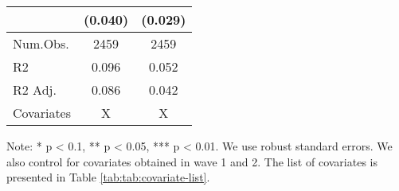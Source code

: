 \begin{table}
\begin{threeparttable}
\begin{tabular}[t]{lcc}
 & (\num{0.040}) & (\num{0.029})\\
\midrule
Num.Obs. & \num{2459} & \num{2459}\\
R2 & \num{0.096} & \num{0.052}\\
R2 Adj. & \num{0.086} & \num{0.042}\\
Covariates & X & X\\
\bottomrule
\end{tabular}
\begin{tablenotes}
\item Note: * p < 0.1, ** p < 0.05, *** p < 0.01. We use robust standard errors. We also control for covariates obtained in wave 1 and 2. The list of covariates is presented in Table \ref{tab:tab:covariate-list}.
\end{tablenotes}
\end{threeparttable}
\end{table}
